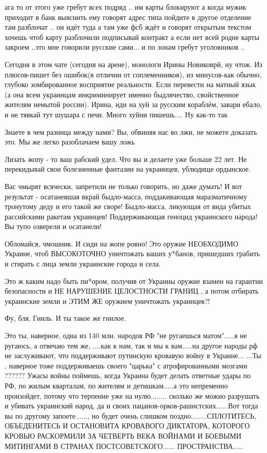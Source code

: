 ага то от этого уже гребут всех подряд .. им карты блокируют а когда мужик
приходит в банк выяснить ему говорят адрес типа пойдите в другое отделение там
разблочат .. он идёт туда а там уже фсб ждёт и говорят открытым текстом хочешь
чтоб карту разблочили подписывай контракт а если нет всей родне карты закроем
..это мне говорили русские сами... и по зонам гребут уголовников ..

Сегодня в этом чате (сегодня на арене), монологи Ирины Новиковрй, ну чтож. Из
плюсов-пишет без ошибок(в отличии от соплеменников), из минусов-как обычно,
глубоко зомбированное восприятие реальности. Если перевести на матный язык (а
она всем украинцам инкриминирует именно быдлячество, свойственное жителям
немытой россии). Ирина, иди на хуй за русским кораблём, завари ебало, и не
тявкай тут шушара с печи. Много хуйни пишешь.... Ну как-то так🤣🌺

Знаете в чем разница между нами? Вы, обвиняя нас во лжи, не можете доказать
это. Мы же легко разоблачаем вашу ложь

Лизать жопу - то ваш рабский удел. Что вы и делаете уже больше 22 лет. Не
перекидывай свои болезненные фантазии на украинцев, ублюдище ордынское.

Вас чмырят всячески, запретили не только говорить, но даже думать! И вот
результат - осатаневшая вкрай быдло-масса, поддакивающая маразматичному
тронутому деду и его такой же своре! Быдло-масса, ликующая от вида убитых
рассийскими ракетам украинцев! Поддерживающая геноцид украинского народа! Вы
тупо озверели и осатанели!

Обломайся, чмошник. И сиди на жопе ровно! Это оружие НЕОБХОДИМО Украине, чтоб
ВЫСОКОТОЧНО уничтожать ваших у*банов, пришедших грабить и стирать с лица земли
украинские города и села.

Это ж каким надо быть пи*ором, получив от Украины оружие взамен на гарантии
безопасности и НЕ НАРУШЕНИЕ ЦЕЛОСТНОСТИ ГРАНИЦ , а потом отбирать украинские
земли и ЭТИМ ЖЕ оружием уничтожать украинцев?!

Фу, бля. Гниль. И ты такое же гнилое.

Это ты, наверное, одна из 140 млн. народов РФ "не ругаешься матом".....я не
ругаюсь, а отвечаю тем же, ....как к нам, так и мы к вам.....на другое народы
рф не заслуживают, что поддерживают путинскую кровавую войну в Украине... ...Ты
, наверное тоже поддерживаешь своего "царька" с атрофированными мозгами ??????
Ужасы войны поймешь, когда Украина будет делать ответные удары по РФ, по жилым
кварталам, по жителям и детишкам.....а это непременно произойдет, потому что
терпение уже на нулю........ сколько же можно разрушать и убивать украинский
народ, да и своих пацанов-орков-рашистских......Вот тогда вы по другому
запоете......, но будет очень слишком поздно........СПЛОТИТЕСЬ, ОБЪЕДЕНИТЕСЬ И
ОСТАНОВИТА КРОВАВОГО ДИКТАТОРА, КОТОРОГО КРОВЬЮ РАСКОРМИЛИ ЗА ЧЕТВЕРТЬ ВЕКА
ВОЙНАМИ И БОЕВЫМИ МИТИНГАМИ В СТРАНАХ ПОСТСОВЕТСКОГО...... ПРОСТРАНСТВА.....

